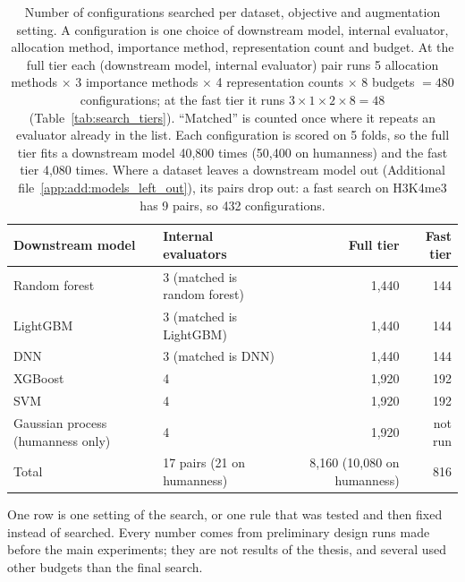 \begin{table}[htbp]
\centering
\small
\caption{Number of configurations searched per dataset, objective and augmentation setting. A configuration is one choice of downstream model, internal evaluator, allocation method, importance method, representation count and budget. At the full tier each (downstream model, internal evaluator) pair runs 5 allocation methods $\times$ 3 importance methods $\times$ 4 representation counts $\times$ 8 budgets $= 480$ configurations; at the fast tier it runs $3 \times 1 \times 2 \times 8 = 48$ (Table~\ref{tab:search_tiers}). ``Matched'' is counted once where it repeats an evaluator already in the list. Each configuration is scored on 5 folds, so the full tier fits a downstream model 40{,}800 times (50{,}400 on humanness) and the fast tier 4{,}080 times. Where a dataset leaves a downstream model out (Additional file~\ref{app:add:models_left_out}), its pairs drop out: a fast search on H3K4me3 has 9 pairs, so 432 configurations.}
\label{tab:add:search_size}
\begin{tabular}{@{}lp{4.2cm}rr@{}}
\toprule
Downstream model & Internal evaluators & Full tier & Fast tier \\
\midrule
Random forest & 3 (matched is random forest) & 1{,}440 & 144 \\
LightGBM & 3 (matched is LightGBM) & 1{,}440 & 144 \\
DNN & 3 (matched is DNN) & 1{,}440 & 144 \\
XGBoost & 4 & 1{,}920 & 192 \\
SVM & 4 & 1{,}920 & 192 \\
Gaussian process (humanness only) & 4 & 1{,}920 & not run \\
\midrule
Total & 17 pairs (21 on humanness) & 8{,}160 (10{,}080 on humanness) & 816 \\
\bottomrule
\end{tabular}
\end{table}

\label{app:add:design_experiments}
One row is one setting of the search, or one rule that was tested and then fixed instead of searched. Every number comes from preliminary design runs made before the main experiments; they are not results of the thesis, and several used other budgets than the final search.

